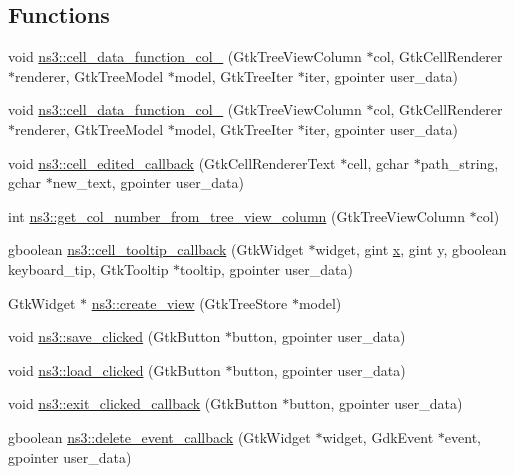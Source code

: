 \subsection*{Functions}
\begin{DoxyCompactItemize}
\item 
void \hyperlink{namespacens3_a26d19ffacc4b28684d3461fd6df90e00}{ns3\+::cell\+\_\+data\+\_\+function\+\_\+col\+\_} (Gtk\+Tree\+View\+Column $\ast$col, Gtk\+Cell\+Renderer $\ast$renderer, Gtk\+Tree\+Model $\ast$model, Gtk\+Tree\+Iter $\ast$iter, gpointer user\+\_\+data)
\item 
void \hyperlink{namespacens3_abf373e954479aa3a2ba07d811d802311}{ns3\+::cell\+\_\+data\+\_\+function\+\_\+col\+\_} (Gtk\+Tree\+View\+Column $\ast$col, Gtk\+Cell\+Renderer $\ast$renderer, Gtk\+Tree\+Model $\ast$model, Gtk\+Tree\+Iter $\ast$iter, gpointer user\+\_\+data)
\item 
void \hyperlink{namespacens3_a33414e6742ae340588ad1af044bbd7e7}{ns3\+::cell\+\_\+edited\+\_\+callback} (Gtk\+Cell\+Renderer\+Text $\ast$cell, gchar $\ast$path\+\_\+string, gchar $\ast$new\+\_\+text, gpointer user\+\_\+data)
\item 
int \hyperlink{namespacens3_ab119da77d89c96aee14f59bd790cb503}{ns3\+::get\+\_\+col\+\_\+number\+\_\+from\+\_\+tree\+\_\+view\+\_\+column} (Gtk\+Tree\+View\+Column $\ast$col)
\item 
gboolean \hyperlink{namespacens3_a0b4dc016823f5ae857205ca40e91cc56}{ns3\+::cell\+\_\+tooltip\+\_\+callback} (Gtk\+Widget $\ast$widget, gint \hyperlink{lte__link__budget__x2__handover__measures_8m_a9336ebf25087d91c818ee6e9ec29f8c1}{x}, gint y, gboolean keyboard\+\_\+tip, Gtk\+Tooltip $\ast$tooltip, gpointer user\+\_\+data)
\item 
Gtk\+Widget $\ast$ \hyperlink{namespacens3_ab9bcfcefc473e60e32d1fe4d08431dab}{ns3\+::create\+\_\+view} (Gtk\+Tree\+Store $\ast$model)
\item 
void \hyperlink{namespacens3_a963273e5e65bfa7288d4645d4f2ec607}{ns3\+::save\+\_\+clicked} (Gtk\+Button $\ast$button, gpointer user\+\_\+data)
\item 
void \hyperlink{namespacens3_af9d871af0ea7b7c0992c485a09016e08}{ns3\+::load\+\_\+clicked} (Gtk\+Button $\ast$button, gpointer user\+\_\+data)
\item 
void \hyperlink{namespacens3_a7f3b1dcf03a7f3a2f0d97a6ccf87fa62}{ns3\+::exit\+\_\+clicked\+\_\+callback} (Gtk\+Button $\ast$button, gpointer user\+\_\+data)
\item 
gboolean \hyperlink{namespacens3_a6b4c03fb0d3d8513e740dd12b7033c2b}{ns3\+::delete\+\_\+event\+\_\+callback} (Gtk\+Widget $\ast$widget, Gdk\+Event $\ast$event, gpointer user\+\_\+data)

\end{DoxyCompactItemize}
